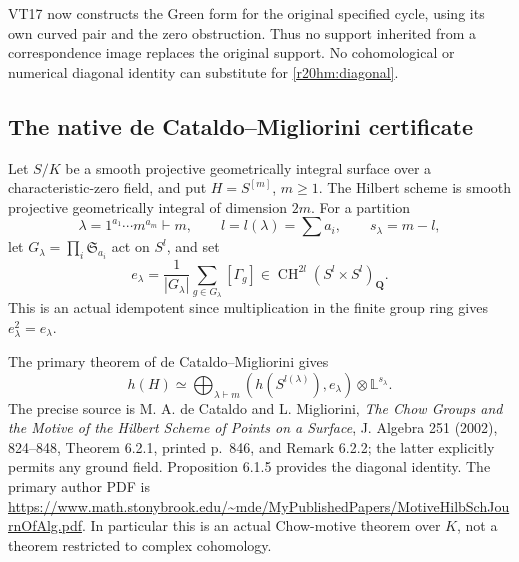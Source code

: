 VT17 now constructs the Green form for the original specified
cycle, using its own curved pair and the zero obstruction.
Thus no support inherited from a correspondence image replaces
the original support.  No cohomological or numerical diagonal
identity can substitute for \eqref{r20hm:diagonal}.

\subsection{The native de Cataldo--Migliorini certificate}

Let $S/K$ be a smooth projective geometrically integral surface
over a characteristic-zero field, and put $H=S^{[m]}$, $m\geq1$.
The Hilbert scheme is smooth projective geometrically integral
of dimension $2m$.  For a partition
\[
 \lambda=1^{a_1}\cdots m^{a_m}\vdash m,
 \qquad l=l(\lambda)=\sum a_i,
 \qquad s_\lambda=m-l,
\]
let $G_\lambda=\prod_i\mathfrak S_{a_i}$ act on $S^l$, and set
\[
 e_\lambda=\frac1{|G_\lambda|}
       \sum_{g\in G_\lambda}[\Gamma_g]
 \in\operatorname{CH}^{2l}(S^l\times S^l)_{\mathbf Q}.
 \tag{HM20.2}\label{r20hm:averaging}
\]
This is an actual idempotent since multiplication in the
finite group ring gives $e_\lambda^2=e_\lambda$.

The primary theorem of de Cataldo--Migliorini gives
\[
 h(H)\simeq\bigoplus_{\lambda\vdash m}
       (h(S^{l(\lambda)}),e_\lambda)
                              \otimes\mathbb L^{s_\lambda}.
 \tag{HM20.3}\label{r20hm:dcm}
\]
The precise source is M. A. de Cataldo and L. Migliorini,
\emph{The Chow Groups and the Motive of the Hilbert Scheme
of Points on a Surface}, J. Algebra 251 (2002), 824--848,
Theorem 6.2.1, printed p.~846, and Remark 6.2.2; the latter
explicitly permits any ground field.  Proposition 6.1.5
provides the diagonal identity.  The primary author PDF is
\url{https://www.math.stonybrook.edu/~mde/MyPublishedPapers/MotiveHilbSchJournOfAlg.pdf}.
In particular this is an actual Chow-motive theorem over $K$,
not a theorem restricted to complex cohomology.

